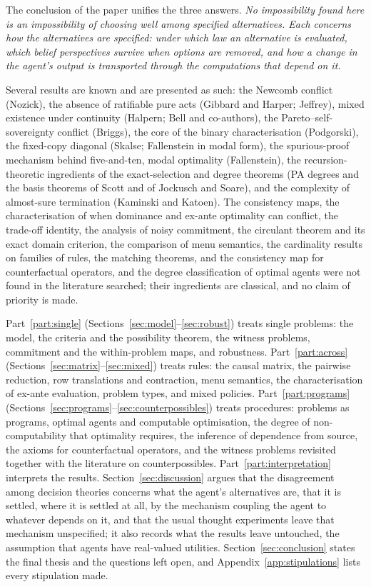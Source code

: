The conclusion of the paper unifies the three answers. \emph{No impossibility found here is an
impossibility of choosing well among specified alternatives. Each concerns how the alternatives are
specified: under which law an alternative is evaluated, which belief perspectives survive when options
are removed, and how a change in the agent's output is transported through the computations that
depend on it.}

Several results are known and are presented as such: the Newcomb conflict (Nozick), the absence of
ratifiable pure acts (Gibbard and Harper; Jeffrey), mixed existence under continuity (Halpern; Bell
and co-authors), the Pareto--self-sovereignty conflict (Briggs), the core of the binary
characterisation (Podgorski), the fixed-copy diagonal (Skalse; Fallenstein in modal form), the
spurious-proof mechanism behind five-and-ten, modal optimality (Fallenstein), the recursion-theoretic
ingredients of the exact-selection and degree theorems (PA degrees and the basis theorems of Scott and
of Jockusch and Soare), and the complexity of almost-sure termination (Kaminski and Katoen). The consistency maps, the characterisation of when
dominance and ex-ante optimality can conflict, the trade-off identity, the analysis of noisy
commitment, the circulant theorem and its exact domain criterion, the comparison of menu semantics,
the cardinality results on families of rules, the matching theorems, and the consistency map for
counterfactual operators, and the degree classification of optimal agents were not found in the
literature searched; their ingredients are classical,
and no claim of priority is made.

Part~\ref{part:single} (Sections~\ref{sec:model}--\ref{sec:robust}) treats single problems: the model,
the criteria and the possibility theorem, the witness problems, commitment and the within-problem
maps, and robustness. Part~\ref{part:across} (Sections~\ref{sec:matrix}--\ref{sec:mixed}) treats rules:
the causal matrix, the pairwise reduction, row translations and contraction, menu semantics, the
characterisation of ex-ante evaluation, problem types, and mixed policies. Part~\ref{part:programs}
(Sections~\ref{sec:programs}--\ref{sec:counterpossibles}) treats procedures: problems as programs,
optimal agents and computable optimisation, the degree of non-computability that optimality
requires, the inference of dependence from source, the axioms for
counterfactual operators, and the witness problems revisited together with the literature on
counterpossibles. Part~\ref{part:interpretation} interprets the results. Section~\ref{sec:discussion}
argues that the disagreement among decision theories concerns what the agent's alternatives are,
that it is settled, where it is settled at all, by the mechanism coupling the agent to whatever
depends on it, and that the usual thought experiments leave that mechanism unspecified; it also
records what the results leave untouched, the assumption that agents have real-valued utilities.
Section~\ref{sec:conclusion} states the final thesis and the questions left open, and
Appendix~\ref{app:stipulations} lists every stipulation made.

